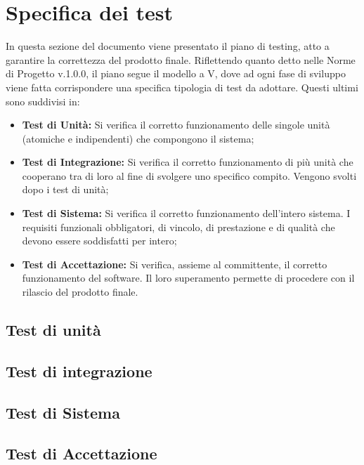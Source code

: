 \section{Specifica dei test}

In questa sezione del documento viene presentato il piano di testing, atto a garantire la correttezza del prodotto finale. Riflettendo quanto detto nelle Norme di Progetto v.1.0.0, il piano segue il modello a V, dove ad ogni fase di sviluppo viene fatta corrispondere una specifica tipologia di test da adottare. Questi ultimi sono suddivisi in:

\begin{itemize}
    \item \textbf{Test di Unità:} Si verifica il corretto funzionamento delle singole unità (atomiche e indipendenti) che compongono il sistema;
    \item \textbf{Test di Integrazione:} Si verifica il corretto funzionamento di più unità che cooperano tra di loro al fine di svolgere uno specifico compito. Vengono svolti dopo i test di unità;
    \item \textbf{Test di Sistema:} Si verifica il corretto funzionamento dell'intero sistema. I requisiti funzionali obbligatori, di vincolo, di prestazione e di qualità che devono essere soddisfatti per intero;
    \item \textbf{Test di Accettazione:} Si verifica, assieme al committente, il corretto funzionamento del software. Il loro superamento permette di procedere con il rilascio del prodotto finale.
\end{itemize}

\subsection{Test di unità}


\subsection{Test di integrazione}


\subsection{Test di Sistema}


\subsection{Test di Accettazione}
